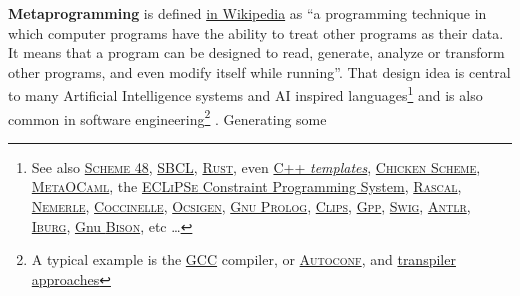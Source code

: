 \documentclass[11pt,a4paper,svgnames]{article}
\begin{document}
\textbf{Metaprogramming}  is defined
\href{https://en.wikipedia.org/wiki/Metaprogramming}{in Wikipedia} as
``a programming technique in which computer programs have the ability
to treat other programs as their data. It means that a program can be
designed to read, generate, analyze or transform other programs, and
even modify itself while running''. That design idea is central to
many Artificial Intelligence systems and AI inspired
languages\footnote{See also \href{http://s48.org}{\textsc{Scheme 48}},
\href{http://sbcl.org/}{\textsc{SBCL}},
\href{http://https://www.rust-lang.org/}{\textsc{Rust}}, even
\href{https://en.cppreference.com/w/cpp/language/templates}{C++
  \emph{templates}}, \href{https://www.call-cc.org/}{\textsc{Chicken
    Scheme}}, \href{
  http://okmij.org/ftp/ML/MetaOCaml.html}{\textsc{MetaOCaml}}, the
\href{http://eclipseclp.org/}{\textsc{ECLiPSe} Constraint Programming
  System}, \href{https://www.rascal-mpl.org/}{\textsc{Rascal}},
\href{http://nemerle.org/}{\textsc{Nemerle}},
\href{http://coccinelle.lip6.fr/}{\textsc{Coccinelle}},
\href{{https://ocsigen.org/}}{\textsc{Ocsigen}},
\href{http://www.gprolog.org/}{\textsc{Gnu Prolog}},
\href{http://www.clipsrules.net/}{\textsc{Clips}},
\href{https://logological.org/gpp}{\textsc{Gpp}},
\href{http://swig.org/}{\textsc{Swig}},
\href{https://www.antlr.org/}{\textsc{Antlr}},
\href{https://github.com/drh/iburg}{\textsc{Iburg}},
\href{https://www.gnu.org/software/bison/}{Gnu \textsc{Bison}}, etc
\ldots} and is also common in software engineering\footnote{A typical
example is the \href{http://gcc.gnu.org}{\textsc{GCC}} compiler, or
\href{https://en.wikipedia.org/wiki/Autoconf}{\textsc{Autoconf}}, and
\href{https://en.wikipedia.org/wiki/Source-to-source_compiler}{transpiler
  approaches}} \cite{Lenat:1983:Eurisko, Lenat:1983:theory,
  Lenat:1991:ev-cycl, Pitrat:1996:FGCS, Pitrat:2009:AST,
  Pitrat:2009:ArtifBeings, Pitrat:blog, Queinnec:1996:LSP,
  Queinnec:2004:ContinWeb, Starynkevitch-1990-EUM,
  Starynkevitch-DSL2011, Starynkevitch-GCCMELTweb,
  Starynkevitch:2007:Multistage, Starynkevitch:2019:bismon-draft,
  Tschudin:2005:HarnessingSC, abelson:1996:sicp, briot:1987:uniform,
  chambers:1991:efficient, cointe:1987:metaclasses, dormoy:1992:meta,
  fouet-starynkevitch:describing-control:1987,
  greiner:1980:representation,
  hernandez-phillips:2019:debugging-bootstrap,hofstadter:2007:strange-loop,
  kay:1996:early-smalltalk, kelsey:1998:r5rs,
  kumar:2015:importance-expert-systems, matthews:2005:operational,
  mazur:2004:compile, nigro:2008:meta, queinnec:2003:lisp,
  Starynkevitch:2009:grow, serrano:1995:bigloo}.  Generating some
\end{document}
